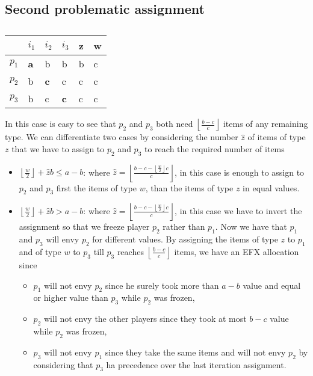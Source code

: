 \documentclass{article}
\newcommand{\floor}[3][2]{\left \lfloor\frac{#2}{#3}\right \rfloor}
\begin{document}
\subsection{Second problematic assignment}
\begin{table}[h]
\centering
\begin{tabular}{|l|l|l|l||l|l|}
\hline
      & $i_1$           & $i_2$      & $i_3$        & z & w \\ \hline
$p_1$ & \textbf{a}      & b          & b            & b & c \\ \hline
$p_2$ & b               & \textbf{c} & c            & c & c \\ \hline
$p_3$ & b               & c          & \textbf{c}   & c & c \\ \hline
\end{tabular}
\caption{}
\label{table-3-players-abb-bcc-bcc}
\end{table}
In this case is easy to see that $p_2$ and $p_3$ both need $\floor{b-c}{c}$ items of any remaining type. We can differentiate two cases by considering the number $\hat z$ of items of type $z$ that we have to assign to $p_2$ and $p_3$ to reach the required number of items
\begin{itemize}
    \item $\floor{w}{2} + \hat z b \le a-b$: where $\hat z = \floor{b-c-\floor{w}{2}c}{c}$, in this case is enough to assign to $p_2$ and $p_3$ first the items of type $w$, than the items of type $z$ in equal values.
    \item $\floor{w}{2} + \hat z b > a-b$: where $\hat z = \floor{b-c-\floor{w}{2}c}{c}$, in this case we have to invert the assignment so that we freeze player $p_2$ rather than $p_1$. Now we have that $p_1$ and $p_3$ will envy $p_2$ for different values. By assigning the items of type $z$ to $p_1$ and of type $w$ to $p_3$ till $p_3$ reaches $\floor{b-c}{c}$ items, we have an EFX allocation since 
    \begin{itemize}
        \item $p_1$ will not envy $p_2$ since he surely took more than $a-b$ value and equal or higher value than $p_3$ while $p_2$ was frozen,
        \item $p_2$ will not envy the other players since they took at most $b-c$ value while $p_2$ was frozen,
        \item $p_3$ will not envy $p_1$ since they take the same items and will not envy $p_2$ by considering that $p_3$ ha precedence over the last iteration assignment.
    \end{itemize}
\end{itemize}
\end{document}

